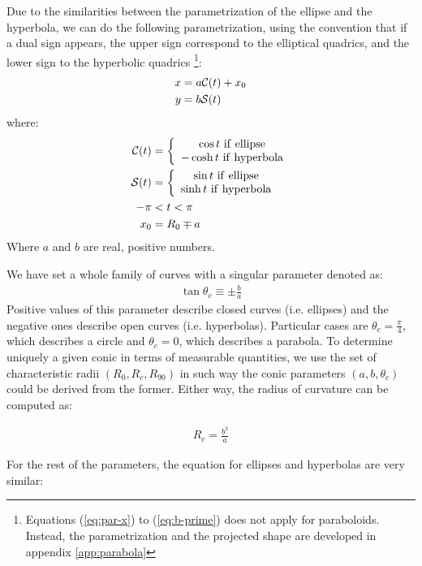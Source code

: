 Due to the similarities between the parametrization of the ellipse and the hyperbola, we can do the following parametrization, using the convention
that if a dual sign appears, the upper sign correspond to the elliptical quadrics, and the lower sign to the hyperbolic quadrics
\footnote{Equations (\ref{eq:par-x}) to (\ref{eq:b-prime}) does not apply for paraboloids. Instead, the parametrization and the
  projected shape are developed in appendix \ref{app:parabola}}:
\begin{align}
x &= a\mathcal{C}(t)+x_0 \label{eq:par-x}\\ 
y &= b\mathcal{S}(t) \label{eq:par-y}
\end{align}
where:
\begin{align}
\mathcal{C}(t) &= \left\lbrace \begin{array}{c}
\cos t ~\mathrm{if~ellipse} \\
-\cosh t ~\mathrm{if~hyperbola}
\end{array}\right.\\
\mathcal{S}(t) &= \left\lbrace \begin{array}{c}
\sin t ~\mathrm{if~ellipse} \\
\sinh t ~\mathrm{if~hyperbola}
\end{array}\right. \\
-\pi &< t < \pi \\
x_0 &=  R_0 \mp a \label{eq:x0}\\
\end{align}
Where $a$ and $b$ are real, positive numbers.

We have set a whole family of curves with a singular parameter denoted as:
\begin{align}
  \tan\theta_c \equiv \pm\frac{b}{a}\label{eq:Thc}
\end{align}
Positive values of this parameter describe closed curves (i.e. ellipses) and the negative ones describe open curves (i.e. hyperbolas).
Particular cases are $\theta_c =\frac{\pi}{4}$,
which describes a circle and $\theta_c=0$, which describes a parabola.
To determine uniquely a given conic in terms of measurable quantities, we use the set of characteristic radii $(R_0,R_c,R_{90})$ in such way the conic
parameters $(a,b,\theta_c)$ could be derived from the former. Either way, the radius of curvature can be computed as:

\begin{align}
R_c = \frac{b^2}{a} \label{eq:Rc-conic}
\end{align}

For the rest of the parameters, the equation for ellipses and hyperbolas are very similar:

